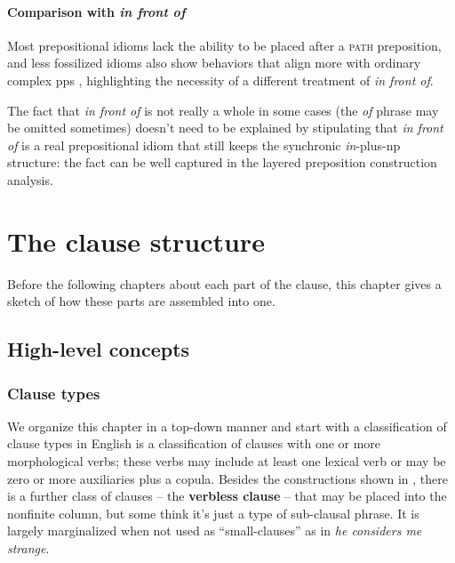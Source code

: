 \documentclass[UTF8, a4paper, oneside, scheme=plain, 12pt]{ctexbook}
\newcommand*{\citepage}[1]{p.~{#1}}
\newcommand*{\concept}[1]{\textbf{#1}}
\newcommand{\form}[1]{\emph{#1}}
\newcommand{\category}[1]{\textsc{#1}}
\begin{document}
\subsubsection{Comparison with \form{in front of}}\label{sec:np.pp.idiom.in-front-of}

Most prepositional idioms lack the ability 
to be placed after a \category{path} preposition,
and less fossilized idioms also show behaviors that align more with ordinary complex \acs{pp}s 
\citep[\citepage{620}]{cgel},
highlighting the necessity of a different treatment of \form{in front of}.

The fact that \form{in front of} is not really a whole in some cases 
(the \form{of} phrase may be omitted sometimes) 
doesn't need to be explained by stipulating that 
\form{in front of} is a real prepositional idiom that 
still keeps the synchronic \form{in}-plus-\acs{np} structure:
the fact can be well captured in the layered preposition construction analysis.

\chapter{The clause structure}\label{chap:simple-clause}

Before the following chapters about each part of the clause,
this chapter gives a sketch of how these parts are assembled into one.

\section{High-level concepts}

\subsection{Clause types}\label{sec:moods}

We organize this chapter in a top-down manner and 
start with a classification of clause types in English
 is a classification of clauses with one or more morphological verbs;
these verbs may include at least one lexical verb 
or may be zero or more auxiliaries plus a copula.
Besides the constructions shown in ,
there is a further class of clauses 
-- the \concept{verbless clause} \citep[\citepage{1266}]{cgel} -- 
that may be placed into the nonfinite column,
but some think it's just a type of sub-clausal phrase.
It is largely marginalized when not used as ``small-clauses'' 
as in \form{he considers me strange}.
\end{document}
